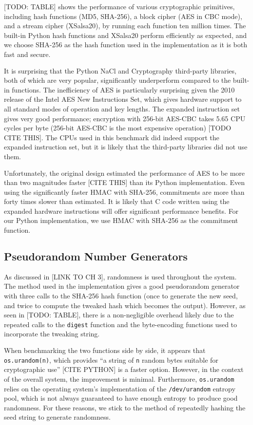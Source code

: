 [TODO: TABLE] shows the performance of various cryptographic primitives, including hash functions (MD5, SHA-256), a block cipher (AES in CBC mode), and a stream cipher (XSalsa20), by running each function ten million times. The built-in Python hash functions and XSalsa20 perform efficiently as expected, and we choose SHA-256 as the hash function used in the implementation as it is both fast and secure.

It is surprising that the Python NaCl and Cryptography third-party libraries, both of which are very popular, significantly underperform compared to the built-in functions. The inefficiency of AES is particularly surprising given the 2010 release of the Intel AES New Instructions Set, which gives hardware support to all standard modes of operation and key lengths. The expanded instruction set gives very good performance; encryption with 256-bit AES-CBC takes 5.65 CPU cycles per byte (256-bit AES-CBC is the most expensive operation) [TODO CITE THIS]. The CPUs used in this benchmark did indeed support the expanded instruction set, but it is likely that the third-party libraries did not use them.

Unfortunately, the original design estimated the performance of AES to be more than two magnitudes faster [CITE THIS] than its Python implementation. Even using the significantly faster HMAC with SHA-256, commitments are more than forty times slower than estimated. It is likely that C code written using the expanded hardware instructions will offer significant performance benefits. For our Python implementation, we use HMAC with SHA-256 as the commitment function.

\subsection{Pseudorandom Number Generators}

As discussed in [LINK TO CH 3], randomness is used throughout the system. The method used in the implementation gives a good pseudorandom generator with three calls to the SHA-256 hash function (once to generate the new seed, and twice to compute the tweaked hash which becomes the output). However, as seen in [TODO: TABLE], there is a non-negligible overhead likely due to the repeated calls to the \texttt{digest} function and the byte-encoding functions used to incorporate the tweaking string.

When benchmarking the two functions side by side, it appears that \texttt{os.urandom(n)}, which provides ``a string of \texttt{n} random bytes suitable for cryptographic use'' [CITE PYTHON] is a faster option. However, in the context of the overall system, the improvement is minimal. Furthermore, \texttt{os.urandom} relies on the operating system's implementation of the \texttt{/dev/urandom} entropy pool, which is not always guaranteed to have enough entropy to produce good randomness. For these reasons, we stick to the method of repeatedly hashing the seed string to generate randomness.

